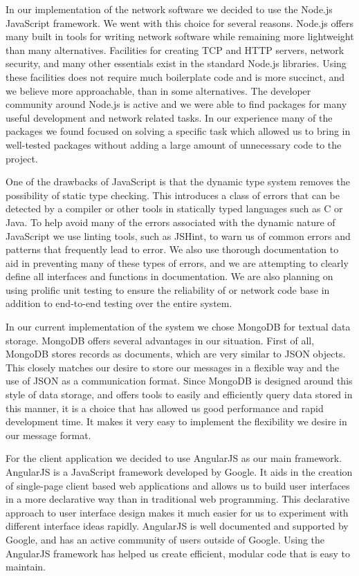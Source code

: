 In our implementation of the network software we decided to use the Node.js
JavaScript framework. We went with this choice for several reasons. Node.js
offers many built in tools for writing network software while remaining more
lightweight than many alternatives. Facilities for creating TCP and HTTP
servers, network security, and many other essentials exist in the standard
Node.js libraries. Using these facilities does not require much boilerplate code
and is more succinct, and we believe more approachable, than in some
alternatives. The developer community around Node.js is active and we were able
to find packages for many useful development and network related tasks. In our
experience many of the packages we found focused on solving a specific task
which allowed us to bring in well-tested packages without adding a large amount
of unnecessary code to the project.

One of the drawbacks of JavaScript is that the dynamic type system removes the
possibility of static type checking. This introduces a class of errors that can
be detected by a compiler or other tools in statically typed languages such as C
or Java. To help avoid many of the errors associated with the dynamic nature of
JavaScript we use linting tools, such as JSHint, to warn us of common errors and
patterns that frequently lead to error. We also use thorough documentation to
aid in preventing many of these types of errors, and we are attempting to clearly
define all interfaces and functions in documentation.  We are also planning on
using prolific unit testing to ensure the reliability of or network code base in
addition to end-to-end testing over the entire system.

In our current implementation of the system we chose MongoDB\cite{mongo_home}
for textual data storage. MongoDB offers several advantages in our situation.
First of all, MongoDB stores records as documents, which are very similar to
JSON objects.  This closely matches our desire to store our messages in a
flexible way and the use of JSON as a communication format. Since MongoDB is
designed around this style of data storage, and offers tools to easily and
efficiently query data stored in this manner, it is a choice that has allowed us
good performance and rapid development time. It makes it very easy to implement
the flexibility we desire in our message format.

For the client application we decided to use AngularJS\cite{angular_home} as our
main framework. AngularJS is a JavaScript framework developed by Google. It aids
in the creation of single-page client based web applications and allows us to
build user interfaces in a more declarative way than in traditional web
programming. This declarative approach to user interface design makes it much
easier for us to experiment with different interface ideas rapidly. AngularJS is
well documented and supported by Google, and has an active community of users
outside of Google. Using the AngularJS framework has helped us create efficient,
modular code that is easy to maintain.

